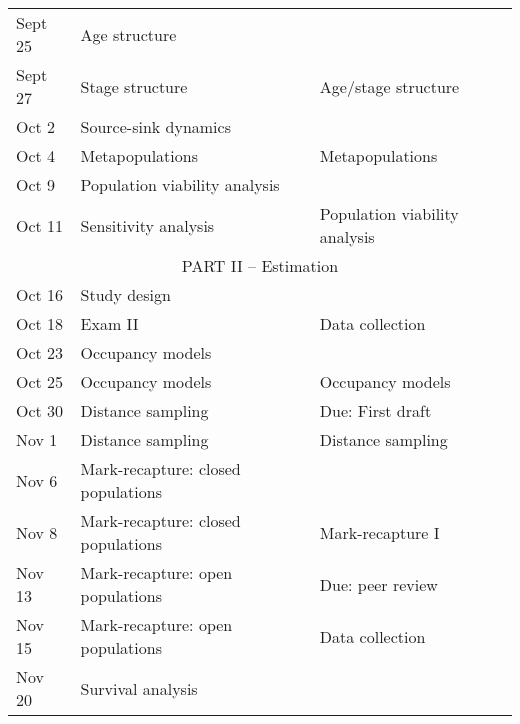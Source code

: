 \documentclass[12pt]{article}
\begin{document}
\begin{center}
\begin{tabular}[c]{lll}
\hline
Sept 25    & Age structure                      &                                      \\
Sept 27    & Stage structure                    & Age/stage structure                  \\
\hline
Oct 2      & Source-sink dynamics               &                                      \\
Oct 4      & Metapopulations                    & Metapopulations                      \\
\hline
Oct 9     & Population viability analysis      &                                      \\
Oct 11     & Sensitivity analysis               & Population viability analysis        \\
\hline
           \multicolumn{3}{c}{PART II -- Estimation}                                   \\
\hline
Oct 16     & Study design                       &                                      \\
Oct 18     & Exam II                            & Data collection                      \\
\hline
Oct 23     & Occupancy models                   &                                      \\
Oct 25     & Occupancy models                   & Occupancy models                     \\
\hline
Oct 30     & Distance sampling                  & Due: First draft                     \\
Nov 1      & Distance sampling                  & Distance sampling                    \\
\hline
Nov 6      & Mark-recapture: closed populations &                                      \\
Nov 8      & Mark-recapture: closed populations & Mark-recapture I                     \\
\hline
Nov 13     & Mark-recapture: open populations   & Due: peer review                     \\
Nov 15     & Mark-recapture: open populations   & Data collection                      \\
\hline
Nov 20     & Survival analysis                  &                                      \\

\end{tabular}
\end{center}
\end{document}
